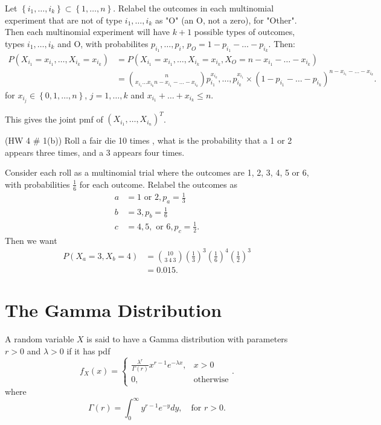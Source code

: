 Let $\left\{ i_{1} , \ldots , i_{k} \right\} \subset \left\{ 1, \ldots, n \right\} $. Relabel the outcomes in each multinomial experiment that are not of type $i_{1} , \ldots , i_{k}$ as "O" (an O, not a zero), for "Other". Then each multinomial experiment will have $k + 1$ possible types of outcomes, types $i_{1} , \ldots , i_{k}$ and O, with probabilites $p_{i_{1}} , \ldots , p_{i_{}}$, $p_{O} = 1 - p_{i_{1}} - \ldots - p_{i_{k}}$. Then:
\begin{align*}
	P\left( X_{i_{1}} = x_{i _{1}}, \ldots, X_{i_{k}} = x_{i_{k}} \right) &= 
	P\left( X_{i_{1}} = x_{i _{1}}, \ldots, X_{i_{k}} = x_{i_{k}}, X_{O} = n - x_{i_{1}} - \ldots - x_{i_{k}} \right)\\ 
									      &= \binom{n}{x_{i_1} \ldots x_{i_{k}} n - x_{i_1} - \ldots - x_{i_k}  }p^{x_{i_k}}_{i_1} , \ldots , p^{x_{i_1}}_{i_k} \times \left( 1 - p_{i_1} - \ldots - p_{i_k} \right) ^{n - x_{i_1} - \ldots - x_{i_k}}
.\end{align*}
for $x_{i_{j}} \in  \left\{ 0, 1, \ldots, n \right\} $, $j = 1, \ldots, k$ and $x_{i_1} + \ldots + x_{i_{k}} \le  n$.

This gives the joint pmf of $\left( X_{i_{1}} , \ldots , X_{i_{n}} \right) ^{T}$.

\begin{eg}
	(HW 4 \# 1(b)) Roll a fair die 10 times , what is the probability that a 1 or 2 appears three times, and a 3 appears four times. 

	Consider each roll as a multinomial trial where the outcomes are 1, 2, 3, 4, 5 or 6, with probabilities  $\frac{1}{6}$ for each outcome. Relabel the outcomes as 
	\begin{align*}
		a &= 1 \text{ or } 2, p_{a} = \frac{1}{3} \\
		b &= 3, p_{b} = \frac{1}{6} \\
		c &= 4, 5,  \text{ or } 6 , p_{c} = \frac{1}{2}
	.\end{align*}
	Then we want 
	\begin{align*}
		P\left( X_{a} = 3, X_{b} = 4 \right) &= \binom{10}{3 \ 4 \ 3} \left( \frac{1}{3} \right) ^{3} \left( \frac{1}{6} \right) ^{4} \left( \frac{1}{2} \right) ^3  \\
		&= 0.015
	.\end{align*}
\end{eg}


\section{The Gamma Distribution}

A random variable $X$ is said to have a Gamma distribution with parameters $r > 0$ and $\lambda > 0$ if it has pdf 
 \[
	 f_{X}\left( x \right) = \begin{cases}
		 \frac{\lambda ^{r}}{\Gamma \left( r \right) } x^{r - 1}e ^{- \lambda x}, & x > 0 \\
		 0, & \text{otherwise}
	 \end{cases}
 .\] 
 where 
 \[
 \Gamma \left( r \right)  = \int_{0}^{\infty} y ^{r - 1} e ^{-y} dy,\quad \text{for } r > 0
 .\] 

